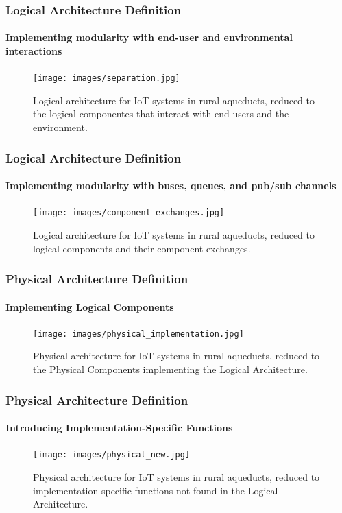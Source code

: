 \documentclass[aspectratio=169]{beamer}
\begin{document}
\begin{frame}
    \frametitle{\small Logical Architecture Definition}
    \framesubtitle{Implementing modularity with end-user and environmental interactions}

    \begin{figure}
        \centering
        \texttt{[image: images/separation.jpg]}
        \caption{Logical architecture for IoT systems in rural aqueducts, reduced to the logical componentes that interact with end-users and the environment.}
    \end{figure}
\end{frame}

\begin{frame}
    \frametitle{\small Logical Architecture Definition}
    \framesubtitle{Implementing modularity with buses, queues, and pub/sub channels}

    \begin{figure}
        \centering
        \texttt{[image: images/component\_exchanges.jpg]}
        \caption{Logical architecture for IoT systems in rural aqueducts, reduced to logical components and their component exchanges.}
    \end{figure}
\end{frame}

\begin{frame}
    \frametitle{\small Physical Architecture Definition}
    \framesubtitle{Implementing Logical Components}

    \begin{figure}
        \centering
        \texttt{[image: images/physical\_implementation.jpg]}
        \caption{Physical architecture for IoT systems in rural aqueducts, reduced to the Physical Components implementing the Logical Architecture.}
    \end{figure}
\end{frame}

\begin{frame}
    \frametitle{\small Physical Architecture Definition}
    \framesubtitle{Introducing Implementation-Specific Functions}

    \begin{figure}
        \centering
        \texttt{[image: images/physical\_new.jpg]}
        \caption{Physical architecture for IoT systems in rural aqueducts, reduced to implementation-specific functions not found in the Logical Architecture.}
    \end{figure}
\end{frame}
\end{document}
